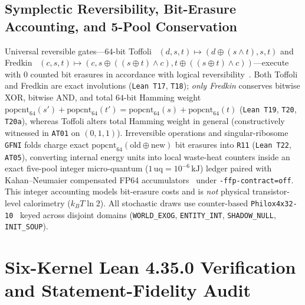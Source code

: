 \documentclass[11pt,reqno]{amsart}
\theoremstyle{plain}
\theoremstyle{definition}
\theoremstyle{remark}
\newcommand{\code}[1]{{\footnotesize\nolinkurl{#1}}}
\begin{document}
\subsection{Symplectic Reversibility, Bit-Erasure Accounting, and 5-Pool Conservation}
Universal reversible gates---$64$-bit Toffoli~\cite{toffoli1980} $(d,s,t) \mapsto (d \oplus (s \wedge t), s, t)$ and Fredkin~\cite{fredkin1982} $(c,s,t) \mapsto (c, s \oplus ((s \oplus t) \wedge c), t \oplus ((s \oplus t) \wedge c))$---execute with $0$ counted bit erasures in accordance with logical reversibility~\cite{landauer1961,bennett1973}. Both Toffoli and Fredkin are exact involutions (\code{Lean T17}, \code{T18}); \emph{only Fredkin} conserves bitwise XOR, bitwise AND, and total $64$-bit Hamming weight $\mathrm{popcnt}_{64}(s') + \mathrm{popcnt}_{64}(t') = \mathrm{popcnt}_{64}(s) + \mathrm{popcnt}_{64}(t)$ (\code{Lean T19}, \code{T20}, \code{T20a}), whereas Toffoli alters total Hamming weight in general (constructively witnessed in \code{AT01} on $(0,1,1)$). Irreversible operations and singular-ribosome \code{GFNI} folds charge exact $\mathrm{popcnt}_{64}(\mathrm{old} \oplus \mathrm{new})$ bit erasures into \code{R11} (\code{Lean T22}, \code{AT05}), converting internal energy units into local waste-heat counters inside an exact five-pool integer micro-quantum ($1\,\mathrm{uq} = 10^{-6}\,\mathrm{kJ}$) ledger paired with Kahan--Neumaier compensated FP64 accumulators~\cite{neumaier1974} under \code{-ffp-contract=off}. This integer accounting models bit-erasure costs and is \emph{not} physical transistor-level calorimetry ($k_B T \ln 2$). All stochastic draws use counter-based \code{Philox4x32-10}~\cite{salmon2011} keyed across disjoint domains (\code{WORLD_EXOG}, \code{ENTITY_INT}, \code{SHADOW_NULL}, \code{INIT_SOUP}).

\section{Six-Kernel Lean 4.35.0 Verification and Statement-Fidelity Audit}
\label{sec:lean}
\end{document}
